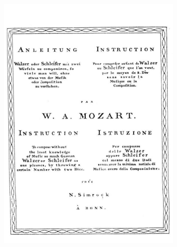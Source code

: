\documentclass[a4paper, openright, 11pt, titlepage]{report}
\theoremstyle{definition}\newtheorem{defin}[propo]{Definition}
\theoremstyle{definition}\newtheorem{obser}[propo]{Remark}
\theoremstyle{definition}\newtheorem{ejem}[propo]{Ejemplo}
\theoremstyle{definition}\newtheorem{algoritmo}[propo]{Algoritmo}
\begin{document}
\begin{figure}[H]
    \centering
    \includegraphics[width = 0.8\textwidth]{Images/Apéndices/Apéndice E/mozart1.png}
\end{figure}
 \newpage
\end{document}
